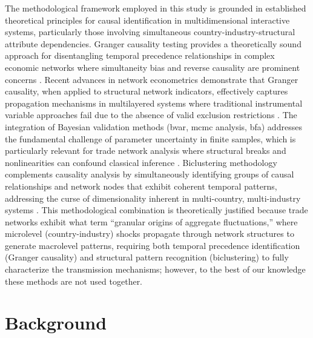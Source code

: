\documentclass[preprint, 3p,
authoryear]{elsarticle} %
\begin{document}
The methodological framework employed in this study is grounded in
established theoretical principles for causal identification in
multidimensional interactive systems, particularly those involving
simultaneous country-industry-structural attribute dependencies. Granger
causality testing provides a theoretically sound approach for
disentangling temporal precedence relationships in complex economic
networks where simultaneity bias and reverse causality are prominent
concerns \citep{hamilton2020time}. Recent advances in network
econometrics demonstrate that Granger causality, when applied to
structural network indicators, effectively captures propagation
mechanisms in multilayered systems where traditional instrumental
variable approaches fail due to the absence of valid exclusion
restrictions \citep{siggiridou2019evaluation}. The integration of
Bayesian validation methods (\gls{bvar}, \gls{mcmc} analysis, \gls{bfa})
addresses the fundamental challenge of parameter uncertainty in finite
samples, which is particularly relevant for trade network analysis where
structural breaks and nonlinearities can confound classical inference
\citep{koop1996impulse, celani2024bayesian}. Biclustering methodology
complements causality analysis by simultaneously identifying groups of
causal relationships and network nodes that exhibit coherent temporal
patterns, addressing the curse of dimensionality inherent in
multi-country, multi-industry systems \citep{g2024comprehensive}. This
methodological combination is theoretically justified because trade
networks exhibit what \citet{carvalho2013great} term ``granular origins
of aggregate fluctuations,'' where microlevel (country-industry) shocks
propagate through network structures to generate macrolevel patterns,
requiring both temporal precedence identification (Granger causality)
and structural pattern recognition (biclustering) to fully characterize
the transmission mechanisms; however, to the best of our knowledge these
methods are not used together.

\section{Background}\label{background}
\end{document}
